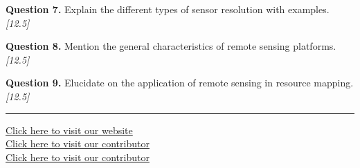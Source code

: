 \documentclass[11pt,a4paper]{article}
\newcommand{\pts}[1]{\hfill   \textit{[#1]}}
\begin{document}
\medskip


\noindent   \textbf{Question 7.} Explain the different types of sensor resolution with examples. \pts{12.5}

\medskip


\noindent   \textbf{Question 8.} Mention the general characteristics of remote sensing platforms. \pts{12.5}

\medskip


\noindent   \textbf{Question 9.} Elucidate on the application of remote sensing in resource mapping. \pts{12.5}

\vfill\rule{\linewidth}{0.4pt}

\begin{center}\small
\href{https://bhu-exam.vercel.app/}{Click here to visit our website}\\[4pt]
\href{https://me-aryan.vercel.app/}{Click here to visit our contributor}\\[4pt]
\href{https://quashan-me.vercel.app/}{Click here to visit our contributor}
\end{center}
\end{document}
